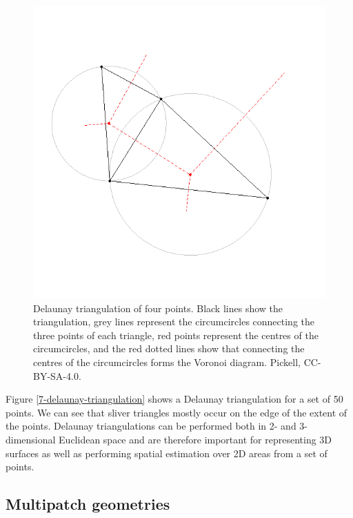 \documentclass[
]{book}
\begin{document}
\begin{figure}
\includegraphics[width=0.75\linewidth]{images/07-delaunay-triangulation-circumcircles} \caption{Delaunay triangulation of four points. Black lines show the triangulation, grey lines represent the circumcircles connecting the three points of each triangle, red points represent the centres of the circumcircles, and the red dotted lines show that connecting the centres of the circumcircles forms the Voronoi diagram. Pickell, CC-BY-SA-4.0.}\label{fig:7-delaunay-triangulation-circumcircles}
\end{figure}

Figure \ref{7-delaunay-triangulation} shows a Delaunay triangulation for a set of 50 points. We can see that sliver triangles mostly occur on the edge of the extent of the points. Delaunay triangulations can be performed both in 2- and 3-dimensional Euclidean space and are therefore important for representing 3D surfaces as well as performing spatial estimation over 2D areas from a set of points.

\hypertarget{multipatch-geometries}{%
\subsection{Multipatch geometries}\label{multipatch-geometries}}
\end{document}
